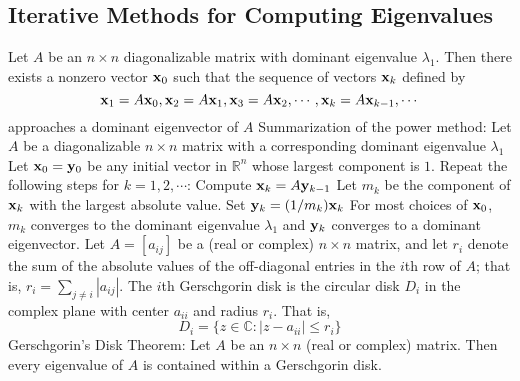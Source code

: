 \documentclass{article}
\begin{document}
        \subsection{Iterative Methods for Computing Eigenvalues}
        \begin{outline}
            \1 Let \(A\) be an \(n\times n\) diagonalizable matrix with dominant eigenvalue \(\lambda_1\). Then there exists a nonzero vector \(\vb x_0\) such that the sequence of vectors \(\vb x_k\) defined by \[\vb x_1=A\vb x_0,\vb x_2=A\vb x_1,\vb x_3=A\vb x_2,\cdots,\vb x_k=A\vb x_{k-1},\cdots\] approaches a dominant eigenvector of $A$
            \1 Summarization of the power method: Let \(A\) be a diagonalizable \(n\times n\) matrix with a corresponding dominant eigenvalue \(\lambda_1\)
                \2 Let \(\vb x_0=\vb y_0\) be any initial vector in \(\mathbb R^n\) whose largest component is \(1\). 
                \2 Repeat the following steps for \(k=1,2,\cdots\):
                    \3 Compute \(\vb x_k=A\vb y_{k-1}\)
                    \3 Let \(m_k\) be the component of \(\vb x_k\) with the largest absolute value. 
                    \3 Set \(\vb y_k=(1/m_k)\vb x_k\)
            \1 For most choices of \(\vb x_0\), \(m_k\) converges to the dominant eigenvalue \(\lambda_1\) and \(\vb y_k\) converges to a dominant eigenvector. 
            \1 Let \(A=[a_{ij}]\) be a (real or complex) \(n\times n\) matrix, and let \(r_i\) denote the sum of the absolute values of the off-diagonal entries in the $i$th row of $A$; that is, \(r_i=\sum_{j\neq i}|a_{ij}|\). The $i$th Gerschgorin disk is the circular disk $D_i$ in the complex plane with center \(a_{ii}\) and radius \(r_i\). That is, \[D_i=\{z\in\mathbb C:|z-a_{ii}|\leq r_i\}\]
            \1 Gerschgorin's Disk Theorem: Let \(A\) be an \(n\times n\) (real or complex) matrix. Then every eigenvalue of $A$ is contained within a Gerschgorin disk. 
        \end{outline}
\end{document}
